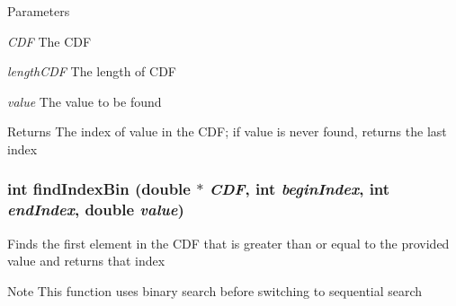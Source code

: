 \begin{DoxyParams}{Parameters}
\item[{\em CDF}]The CDF \item[{\em lengthCDF}]The length of CDF \item[{\em value}]The value to be found \end{DoxyParams}
\begin{DoxyReturn}{Returns}
The index of value in the CDF; if value is never found, returns the last index 
\end{DoxyReturn}
\hypertarget{ex__particle__CUDA__naive_8cu_a0952c4d9efa944180ca6deb470239fba}{
\subsubsection[{findIndexBin}]{\setlength{\rightskip}{0pt plus 5cm}int findIndexBin (double $\ast$ {\em CDF}, \/  int {\em beginIndex}, \/  int {\em endIndex}, \/  double {\em value})}}
\label{ex__particle__CUDA__naive_8cu_a0952c4d9efa944180ca6deb470239fba}
Finds the first element in the CDF that is greater than or equal to the provided value and returns that index \begin{DoxyNote}{Note}
This function uses binary search before switching to sequential search 
\end{DoxyNote}

